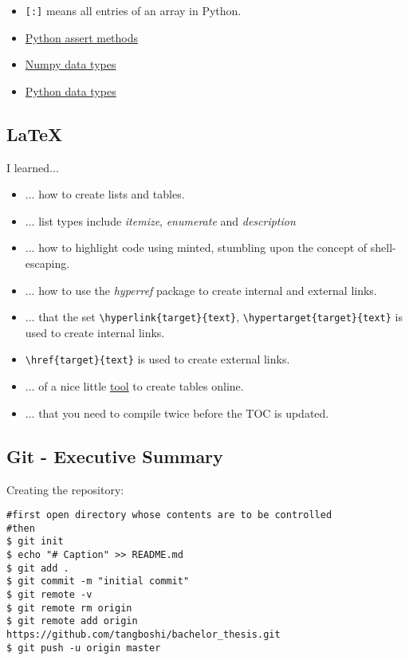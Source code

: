 \documentclass{article}
\begin{document}
\begin{itemize}
	\item \verb|[:]| means all entries of an array in Python.
	\item \href{https://docs.python.org/2/library/unittest.html#assert-methods}{Python assert methods}
	\item \href{https://docs.scipy.org/doc/numpy/user/basics.types.html}{Numpy data types}
	\item \href{https://docs.python.org/2/library/datatypes.html}{Python data types}
\end{itemize}

\subsection{\LaTeX}

I learned...
\begin{itemize} 
	\item ... how to create lists and tables.
	\item ... list types include \emph{itemize}, \emph{enumerate} and \emph{description}
	\item ... how to highlight code using minted, stumbling upon the concept of shell-escaping.
	\item ... how to use the \emph{hyperref} package to create internal and external links.
	\item ... that the set \verb|\hyperlink{target}{text}|, \verb|\hypertarget{target}{text}| is used to create internal links.
	\item \verb|\href{target}{text}| is used to create external links.
	\item ... of a nice little \href{http://www.tablesgenerator.com/}{tool} to create tables online.
	\item  ... that you need to compile twice before the TOC is updated.
\end{itemize}

\subsection{Git - Executive Summary}

Creating the repository:

\begin{verbatim}
#first open directory whose contents are to be controlled
#then
$ git init
$ echo "# Caption" >> README.md
$ git add .
$ git commit -m "initial commit"
$ git remote -v
$ git remote rm origin
$ git remote add origin https://github.com/tangboshi/bachelor_thesis.git
$ git push -u origin master
\end{verbatim}
\end{document}
